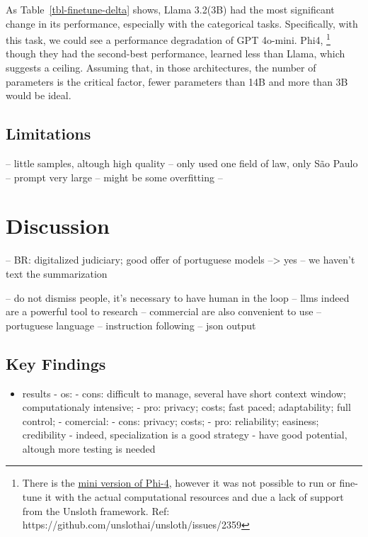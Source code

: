 \documentclass[
  12pt,
]{article}
\providecommand{\tightlist}{%
  \setlength{\itemsep}{0pt}\setlength{\parskip}{0pt}}\usepackage{longtable,booktabs,array}
\begin{document}
As Table~\ref{tbl-finetune-delta} shows, Llama 3.2(3B) had the most
significant change in its performance, especially with the categorical
tasks. Specifically, with this task, we could see a performance
degradation of GPT 4o-mini. Phi4, \footnote{There is the
  \href{https://huggingface.co/microsoft/Phi-4-mini-instruct}{mini
  version of Phi-4}, however it was not possible to run or fine-tune it
  with the actual computational resources and due a lack of support from
  the Unsloth framework. Ref:
  https://github.com/unslothai/unsloth/issues/2359} though they had the
second-best performance, learned less than Llama, which suggests a
ceiling. Assuming that, in those architectures, the number of parameters
is the critical factor, fewer parameters than 14B and more than 3B would
be ideal.

\subsection{Limitations}\label{sec-limitations}

-- little samples, altough high quality -- only used one field of law,
only São Paulo -- prompt very large -- might be some overfitting --

\section{Discussion}\label{sec-discussion}

-- BR: digitalized judiciary; good offer of portuguese models
--\textgreater{} yes -- we haven't text the summarization

-- do not dismiss people, it's necessary to have human in the loop --
llms indeed are a powerful tool to research -- commercial are also
convenient to use -- portuguese language -- instruction following --
json output

\subsection{Key Findings}\label{sec-key-findinds}

\begin{itemize}
\tightlist
\item
  results - os: - cons: difficult to manage, several have short context
  window; computationaly intensive; - pro: privacy; costs; fast paced;
  adaptability; full control; - comercial: - cons: privacy; costs; -
  pro: reliability; easiness; credibility - indeed, specialization is a
  good strategy - have good potential, altough more testing is needed
\end{itemize}
\end{document}
